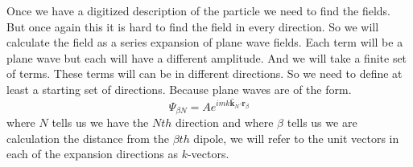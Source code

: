 \documentclass{article}
\begin{document}
Once we have a digitized description of the particle we need to find the
fields. But once again this it is hard to find the field in every direction.
So we will calculate the field as a series expansion of plane wave fields.
Each term will be a plane wave but each will have a different amplitude. And
we will take a finite set of terms. These terms will can be in different
directions. So we need to define at least a starting set of directions.
Because plane waves are of the form. 
\begin{equation*}
\Psi _{\beta N}=Ae^{imk\mathbf{\hat{k}}_{N}\mathbf{\cdot r}_{\beta }}
\end{equation*}%
where $N$ tells us we have the $Nth$ direction and where $\beta $ tells us
we are calculation the distance from the $\beta th$ dipole, we will refer to
the unit vectors in each of the expansion directions as $k$-vectors. 
\end{document}
